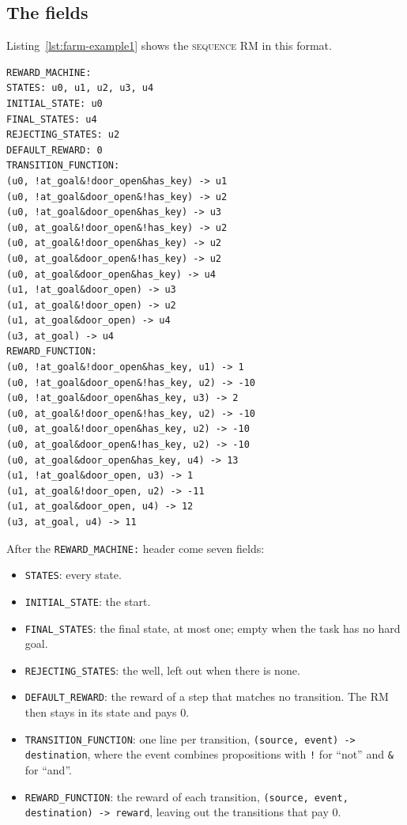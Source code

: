 \documentclass[11pt,english,listoffigures,listoftables]{tfgetsinf}
\newcommand{\runex}[1]{\textsc{#1}}  %
\begin{document}
\subsection{The fields}
Listing~\ref{lst:farm-example1} shows the \runex{sequence} RM in this format.

\noindent\begin{minipage}{\linewidth}
\begin{lstlisting}[style=rm,caption={The RM that FARM builds for the \runex{sequence} example.},label={lst:farm-example1}]
REWARD_MACHINE:
STATES: u0, u1, u2, u3, u4
INITIAL_STATE: u0
FINAL_STATES: u4
REJECTING_STATES: u2
DEFAULT_REWARD: 0
TRANSITION_FUNCTION:
(u0, !at_goal&!door_open&has_key) -> u1
(u0, !at_goal&door_open&!has_key) -> u2
(u0, !at_goal&door_open&has_key) -> u3
(u0, at_goal&!door_open&!has_key) -> u2
(u0, at_goal&!door_open&has_key) -> u2
(u0, at_goal&door_open&!has_key) -> u2
(u0, at_goal&door_open&has_key) -> u4
(u1, !at_goal&door_open) -> u3
(u1, at_goal&!door_open) -> u2
(u1, at_goal&door_open) -> u4
(u3, at_goal) -> u4
REWARD_FUNCTION:
(u0, !at_goal&!door_open&has_key, u1) -> 1
(u0, !at_goal&door_open&!has_key, u2) -> -10
(u0, !at_goal&door_open&has_key, u3) -> 2
(u0, at_goal&!door_open&!has_key, u2) -> -10
(u0, at_goal&!door_open&has_key, u2) -> -10
(u0, at_goal&door_open&!has_key, u2) -> -10
(u0, at_goal&door_open&has_key, u4) -> 13
(u1, !at_goal&door_open, u3) -> 1
(u1, at_goal&!door_open, u2) -> -11
(u1, at_goal&door_open, u4) -> 12
(u3, at_goal, u4) -> 11
\end{lstlisting}
\end{minipage}

\noindent After the \texttt{REWARD\_MACHINE:} header come seven fields:
\begin{itemize}
    \item \texttt{STATES}: every state.
    \item \texttt{INITIAL\_STATE}: the start.
    \item \texttt{FINAL\_STATES}: the final state, at most one; empty when the task has no hard goal.
    \item \texttt{REJECTING\_\allowbreak STATES}: the well, left out when there is none.
    \item \texttt{DEFAULT\_REWARD}: the reward of a step that matches no transition. The RM then stays in its state and pays 0.
    \item \texttt{TRANSITION\_\allowbreak FUNCTION}: one line per transition, \texttt{(source, event) -> destination}, where the event combines propositions with \texttt{!} for ``not'' and \texttt{\&} for ``and''.
    \item \texttt{REWARD\_FUNCTION}: the reward of each transition, \texttt{(source, event, destination) -> reward}, leaving out the transitions that pay 0.
\end{itemize}
\end{document}

